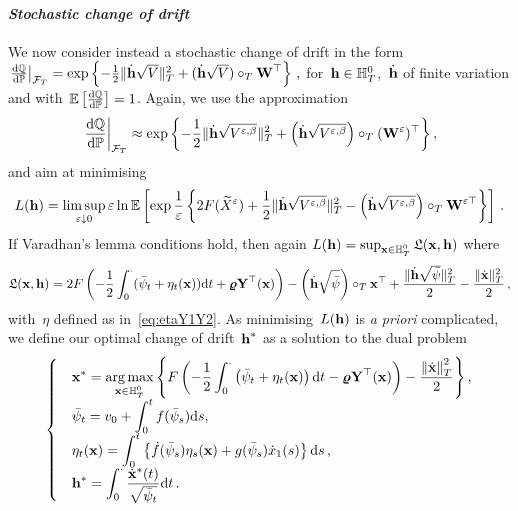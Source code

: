 \paragraph{\textit{Stochastic change of drift}}
We now consider instead a stochastic change of drift in the form
$
\left.\frac{\D\QQ}{\D\PP}\right\vert_{\Ff_T} =\nobreak \exp\left\{-\frac{1}{2}\|\dot{\hh}\sqrt{V}\|_{T}^2 + (\dot{\hh}\sqrt{V})\cT\Wf^\top\right\}\,,
$
for~${\hh \in \HH_T^0}$,~$\dot{\hh}$ of finite variation and with~$\EE\left[\frac{\D\QQ}{\D\PP}\right]=1$. 
Again, we use the approximation
\[
\left.\frac{\D\QQ}{\D\PP}\right\vert_{\Ff_T} \approx \exp\left\{-\frac{1}{2}\|\dot{\hh}\sqrt{V^{\eps,\beta}}\|_{T}^2 + \left(\dot{\hh}\sqrt{V^{\eps,\beta}}\right)\cT({\Wf^\eps})^\top\right\},
\]
and aim at minimising
\[
L(\hh) = \limsup\limits_{\eps \downarrow 0} \eps\ln\EE\left[\exp\frac{1}{\eps}\left\{
2F(\widetilde{X}^\eps) +\frac{1}{2}\|\dot{\hh}\sqrt{V^{\eps,\beta}}\|^2_T - \left (\dot{\hh}\sqrt{V^{\eps,\beta}}\right )\cT \Wf^{\eps\top}\right\}\right]\,.
\]
If Varadhan's lemma conditions hold, then again
$L(\hh) = \sup_{\xx \in \HH_T^0}\Lf(\xx,\hh)$
where
$$
\Lf(\xx,\hh) = 2F\left(-\frac{1}{2}\int_0^\cdot(\bar\psi_t + \eta_t(\xx))\D t + \vrho \Yf^\top(\xx)\right) - \left (\dot{\hh}\sqrt{\bar\psi}\right )\cT \xx^\top + \frac{\|\dot{\hh}\sqrt{\bar\psi}\|_{T}^2}{2}
- \frac{\|\dot{\xx}\|_{T}^2}{2}\,,
$$
with~$\eta$ defined as in~\eqref{eq:etaY1Y2}. As minimising~$L(\hh)$ is \textit{a priori} complicated, we define our optimal change of drift~$\hh^{*}$ as a solution to the dual problem
\[
\begin{cases}
&\displaystyle \xx^{*} = \argmax\limits_{\xx \in \HH_T^0} \left\{
F\left(-\frac{1}{2}\int_0^\cdot \left(\bar\psi_t + \eta_t(\xx)\right)\D t - \vrho \Yf^\top(\xx) \right)
- \frac{\left\|\dot{\xx}\right\|_{T}^2}{2}
\right\},\\
&\displaystyle \bar\psi_t = v_0 + \int_0^t f(\bar\psi_s)\D s, \\
&\displaystyle \eta_t(\xx) = \int_0^t\left\{\dot{f}(\bar\psi_s)\eta_s(\xx) + g(\bar\psi_s)\dot{x}_1(s)\right\}\D s\,, \\
&\displaystyle  \hh^{*} = \int_0^\cdot\frac{\dot{\xx}^{*}(t)}{\sqrt{\bar\psi_t}}\D t\,.
\end{cases}
\]

